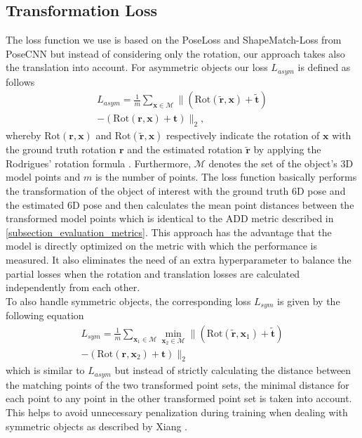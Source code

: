 \documentclass[twocolumn, 10pt, letterpaper]{article}
\begin{document}
\subsection{Transformation Loss}
\label{subsection_transformation_loss}
The loss function we use is based on the PoseLoss and ShapeMatch-Loss from PoseCNN\cite{PoseCNN} but instead of considering only the rotation, our approach takes also the translation into account. For asymmetric objects our loss $L_{asym}$ is defined as follows
\begin{equation}
\label{equation_asym_loss}
\begin{split}
L_{asym} = \frac{1}{m}\sum_{\mathbf{x} \in \mathcal{M}}\| (\text{Rot}(\mathbf{\tilde{r}}, \mathbf{x}) + \mathbf{\tilde{t}}) \\
-  (\text{Rot}(\mathbf{r}, \mathbf{x}) + \mathbf{t})  \|_2,
\end{split}
\end{equation}
whereby $\text{Rot}(\mathbf{r}, \mathbf{x})$ and $\text{Rot}(\mathbf{\tilde{r}}, \mathbf{x})$ respectively indicate the rotation of $\mathbf{x}$ with the ground truth rotation $\mathbf{r}$ and the estimated rotation $\mathbf{\tilde{r}}$ by applying the Rodrigues' rotation formula \cite{RodriguesRotation_1}\cite{RodriguesRotation_2}. Furthermore, $\mathcal{M}$ denotes the set of the object's 3D model points and $m$ is the number of points. The loss function basically performs the transformation of the object of interest with the ground truth 6D pose and the estimated 6D pose and then calculates the mean point distances between the transformed model points which is identical to the ADD metric described in \autoref{subsection_evaluation_metrics}. This approach has the advantage that the model is directly optimized on the metric with which the performance is measured. It also eliminates the need of an extra hyperparameter to balance the partial losses when the rotation and translation losses are calculated independently from each other.\\

To also handle symmetric objects, the corresponding loss $L_{sym}$ is given by the following equation
\begin{equation}
\label{equation_sym_loss}
\begin{split}
L_{sym} = \frac{1}{m}\sum_{\mathbf{x}_1 \in \mathcal{M}} \min_{\mathbf{x}_2 \in \mathcal{M}} \| (\text{Rot}(\mathbf{\tilde{r}}, \mathbf{x}_1) + \mathbf{\tilde{t}}) \\
 - (\text{Rot}(\mathbf{r}, \mathbf{x}_2) + \mathbf{t})  \|_2
\end{split}
\end{equation}
which is similar to $L_{asym}$ but instead of strictly calculating the distance between the matching points of the two transformed point sets, the minimal distance for each point to any point in the other transformed point set is taken into account. This helps to avoid unnecessary penalization during training when dealing with symmetric objects as described by Xiang \etal\cite{PoseCNN}.\\
\end{document}
